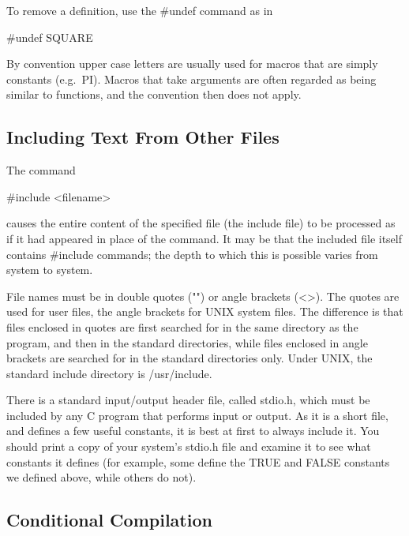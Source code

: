 To remove a definition, use the {\cd \#undef} command as in
\begin{code}
\#undef SQUARE
\end{code}
\noindent
     By convention upper case letters are usually used for macros that
are simply constants (e.g.\ PI). Macros that take arguments are often
regarded as being similar to functions, and the convention then does not
apply.


\subsection{Including Text From Other Files}

The command 
\begin{code}
\#include  <filename>
\end{code}
\noindent
causes  the  entire content  of  the specified file  (the {\kc
include file\/}) to be processed as  if it had appeared  in  place of
the command. It may be  that the included file itself contains {\cd
\#include} commands; the depth to which this is possible varies from
system to system.

     File names  must be  in double quotes ({\cd ""}) or angle brackets
({\cd <>}). The quotes are used  for user  files, the  angle brackets 
for  UNIX  system  files.  
The difference is that files enclosed in
quotes are first searched for in the same directory as  the program, 
and then  in the standard directories, while files enclosed in angle
brackets are searched for in the standard directories only.  Under
UNIX, the standard include directory is {\cd /usr/include}.

There is  a  standard input/output header file, called 
{\fn stdio.h},
which must be included  by any  C program that performs input or
output. As it is a short file, and defines a few useful constants, it
is best at first to always include it. You should print  a copy of your
system's {\fn stdio.h} file and examine it to see what constants it
defines (for example, some define the {\cd TRUE} and {\cd FALSE}
constants we defined above, while others do not).

     

\subsection{Conditional Compilation}

